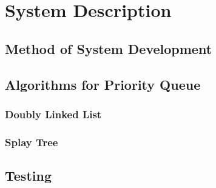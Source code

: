 \documentclass[a4paper,11pt]{kth-mag}
\begin{document}

\chapter{System Description}

\section{Method of System Development}

\section{Algorithms for Priority Queue}
\subsection{Doubly Linked List}
\subsection{Splay Tree}





%
\section{Testing}
\end{document}
